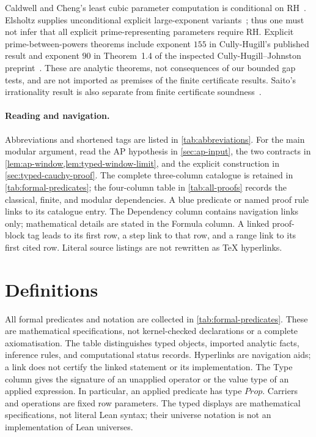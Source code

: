 \documentclass[11pt,reqno]{amsart}
\makeatletter
\theoremstyle{blueplain}
\newcounter{type}
\newcommand{\defref}[1]{\hyperref[#1]{Definition~\ref*{#1}}}
\numberwithin{equation}{section}
\DeclareRobustCommand{\defref}[1]{%
  \hyperlink{def:#1}{\ensuremath{\csname PredicateName@#1\endcsname}}}
\def\defref#1{#1}%
\def\hyperlink#1#2{#2}}
\makeatother
\begin{document}
Caldwell and Cheng's least cubic parameter computation is conditional on
\hyperlink{def:RH}{RH}~\cite{CaldwellCheng2005}. Elsholtz supplies unconditional explicit
large-exponent variants~\cite{Elsholtz2020}; thus one must not infer that
all explicit prime-representing parameters require \hyperlink{def:RH}{RH}. Explicit
prime-between-powers theorems include exponent \(155\) in Cully-Hugill's
published result and exponent \(90\) in Theorem~1.4 of the inspected
Cully-Hugill--Johnston preprint~\cite{CullyHugill2023,CullyHugillJohnston2026}.
These are analytic theorems, not consequences of our bounded gap tests,
and are not imported as premises of the finite certificate results. Saito's irrationality result is
also separate from finite certificate soundness~\cite{Saito2025}.


\paragraph{Reading and navigation.}
Abbreviations and shortened tags are listed in \cref{tab:abbreviations}.
For the main modular argument, read the \hyperlink{term:AP}{AP} hypothesis in
\cref{sec:ap-input}, the two contracts in
\cref{lem:ap-window,lem:typed-window-limit}, and the explicit construction in
\cref{sec:typed-cauchy-proof}. The complete three-column catalogue is retained
in \cref{tab:formal-predicates}; the four-column table in
\cref{tab:all-proofs} records the classical, finite, and modular dependencies.
A blue predicate or named proof rule links to its catalogue entry.
The Dependency column contains navigation links only; mathematical details
are stated in the Formula column. A linked proof-block tag leads to its
first row, a step link to that row, and a range link to its first cited row.
Literal source listings are not rewritten as TeX hyperlinks.

\section{Definitions}\label{sec:defs}

All formal predicates and notation are collected in
\cref{tab:formal-predicates}. These are mathematical specifications,
not kernel-checked declarations or a complete axiomatisation.
The table distinguishes typed objects, imported analytic facts,
inference rules, and computational status records. Hyperlinks are navigation
aids; a link does not certify the linked statement or its implementation.
The Type column gives the signature of an unapplied operator or the value
type of an applied expression. In particular, an applied predicate has type
\(\defref{Prop}\). Carriers and operations are fixed row parameters.
The typed displays are mathematical specifications, not literal Lean syntax;
their universe notation is not an implementation of Lean universes.
\end{document}
